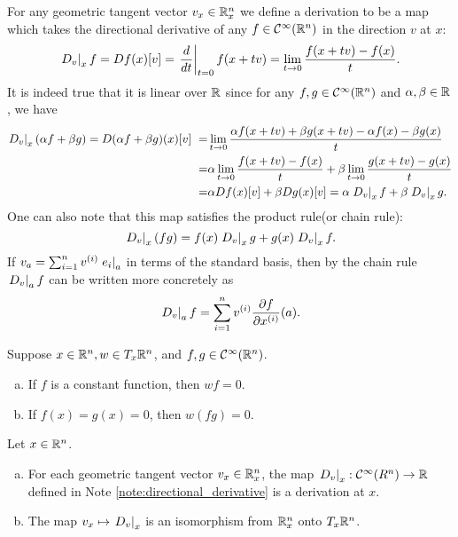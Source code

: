 \documentclass[11pt,a4paper]{article}
\begin{document}
\begin{remark}\label{note:directional_derivative}
For any geometric tangent vector $v_x\in \mathbb{R}^n_x$ we define a derivation to be a map which takes the directional derivative of any $f\in\mathcal{C}^\infty(\mathbb{R}^n)$ in the direction $v$ at $x$:
$$
\left.D_v\right|_{x} f = Df(x)[v] = \left.\dfrac{d}{dt}\right|_{t=0} f(x+tv) = 
\lim_{t\rightarrow 0} \dfrac{f(x+tv)-f(x)}{t}.
$$
It is indeed true that it is linear over $\mathbb{R}$ since for any $f, g\in \mathcal{C}^\infty(\mathbb{R}^n)$ and $\alpha,\beta\in\mathbb{R}$, we have 
\begin{align*}
\left.D_v\right|_{x}(\alpha f+\beta g) = D(\alpha f+\beta g)(x)[v] \
=& \lim_{t\rightarrow 0} \dfrac{\alpha f(x+tv)+\beta g(x+tv) - \alpha f(x)-\beta g(x)}{t} \\
=& \alpha \lim_{t\rightarrow 0} \dfrac{f(x+tv)- f(x)}{t} + \beta\lim_{t\rightarrow 0} \dfrac{g(x+tv) - g(x)}{t} \\
=& \alpha Df(x)[v]+\beta Dg(x)[v] 
= \alpha \left.D_v\right|_{x} f+ \beta\left.D_v\right|_{x} g.
\end{align*}
One can also note that this map satisfies the product rule(or chain rule):
$$ \left.D_v\right|_{x}(fg) = f(x)\left.D_v\right|_{x}g + g(x)\left.D_v\right|_{x}f. $$
If $v_a = \sum_{i=1}^n v^{(i)} \left.e_i\right|_{a}$ in terms of the standard basis, then by the chain rule $\left.D_v\right|_{a}f$ can be written more concretely as
$$
\left.D_v\right|_{a}f = \sum_{i=1}^n v^{(i)} \dfrac{\partial f}{\partial x^{(i)}}(a).
$$
\end{remark}

\begin{lemma}
Suppose $x\in\mathbb{R}^n,w\in T_x\mathbb{R}^n$, and $f,g\in\mathcal{C}^\infty(\mathbb{R}^n)$.
\begin{enumerate}[(a)]
    \item If $f$ is a constant function, then $wf = 0$.
    \item If $f(x) = g(x) = 0$, then $w(fg) = 0$.
\end{enumerate}
\end{lemma}

\begin{proposition}
Let $x\in \mathbb{R}^n$.
\begin{enumerate}[(a)]
    \item For each geometric tangent vector $v_x\in\mathbb{R}^n_x$, the map $\left.D_v\right|_{x}:\mathcal{C}^\infty(R^n)\rightarrow \mathbb{R}$ defined in Note \ref{note:directional_derivative} is a derivation at $x$.
    \item The map $v_x\mapsto \left.D_v\right|_{x}$ is an isomorphism from $\mathbb{R}^n_x$ onto $T_x\mathbb{R}^n$.
\end{enumerate}
\end{proposition}
\end{document}
